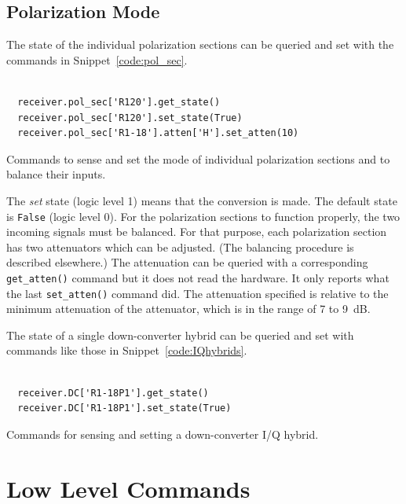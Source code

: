 \documentclass[letterpaper,11pt]{book}
\begin{document}
\subsection{Polarization Mode}

The state of the individual polarization sections can be queried and set with
the commands in Snippet~\ref{code:pol_sec}.
\begin{code}[h!tb]
\begin{center}
\begin{verbatim}

  receiver.pol_sec['R120'].get_state()
  receiver.pol_sec['R120'].set_state(True)
  receiver.pol_sec['R1-18'].atten['H'].set_atten(10)\end{verbatim}
  \caption[Control of individual polarization sections]
  {\label{code:pol_sec}Commands
  to sense and set the mode of individual
  polarization sections and to balance their inputs.}
\end{center}
\end{code}  
The {\it set} state (logic level 1) means that the conversion is made.  The
default state is {\tt False} (logic level 0).
For the polarization sections to function properly, the two incoming signals
must be balanced.  For that purpose, each polarization section has two
attenuators which can be adjusted. 
(The balancing procedure is described elsewhere.)
The attenuation can be queried with a corresponding {\tt get\_atten()}
command but it does not read the hardware.  It only reports what the last
{\tt set\_atten()} command did.  The attenuation specified is relative to
the minimum attenuation of the attenuator, which is in the range of 7 to 9~dB.

The state of a single down-converter hybrid can be queried and set
with commands like those in 
Snippet~\ref{code:IQhybrids}.
\begin{code}[h!tb]
\begin{center}
\begin{verbatim}

  receiver.DC['R1-18P1'].get_state()
  receiver.DC['R1-18P1'].set_state(True)\end{verbatim}
\caption{\label{code:IQhybrids}Commands for sensing and setting a 
down-converter I/Q hybrid.}
\end{center}
\end{code}



\section{Low Level Commands}
\end{document}
